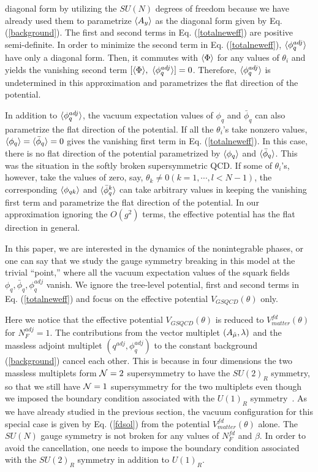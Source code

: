 \documentclass[a4paper,12pt]{article}
\begin{document}
diagonal form by utilizing the $SU(N)$ degrees of freedom
because we have already used them to parametrize $\langle A_y \rangle$ as 
the diagonal form given by Eq. (\ref{background}). 
The first and second terms in Eq. (\ref{totalneweff}) are positive 
semi-definite. In order to minimize the second term 
in Eq. (\ref{totalneweff}), $\langle \phi_q^{adj} \rangle$ have only 
a diagonal form. Then, it commutes with 
$\langle \Phi \rangle$ for any values of $\theta_i$ and yields the vanishing 
second term $[\langle \Phi \rangle,~\langle \phi_q^{adj} \rangle]=0$. 
Therefore, $\langle \phi_q^{adj} \rangle$ is undetermined in 
this approximation and parametrizes the flat direction of the potential.
\par
In addition to $\langle \phi_q^{adj} \rangle$, the vacuum 
expectation values of $\phi_q$ and ${\bar\phi}_q$ can also 
parametrize the flat direction of the potential. 
If all the $\theta_i$'s take nonzero values, 
$\langle \phi_q \rangle=\langle {\bar\phi}_q \rangle=0$ gives the 
vanishing first term in Eq. (\ref{totalneweff}). 
In this case, there is no flat direction
of the potential parametrized by $\langle \phi_q \rangle$ and $\langle {\bar\phi}_q \rangle$. 
This was the situation in the softly 
broken supersymmetric QCD. 
If some of $\theta_i$'s, however, take the values of 
zero, say, $\theta_k\neq 0 (k=1,\cdots, l< N-1)$, the corresponding 
$\langle \phi_{qk} \rangle$ and $\langle {\bar\phi}_q^{k} \rangle$ can take 
arbitrary values in keeping the vanishing first term and parametrize
the flat direction of the potential. In our approximation
ignoring the $O(g^2)$ terms, the effective potential has the 
flat direction in general.
\par
In this paper, we are interested in the dynamics of the nonintegrable 
phases, or one can say that 
we study the gauge symmetry breaking in this
model at the trivial ``point,'' where all the vacuum expectation 
values of the squark 
fields $\phi_q, {\bar\phi}_q, \phi_q^{adj}$ vanish.  We  
ignore the tree-level potential, first and second terms in 
Eq. (\ref{totalneweff}) and  
focus on the effective potential $V_{GSQCD}(\theta)$ only.
\par
Here we notice that the effective potential $V_{GSQCD}(\theta)$ is 
reduced to $V_{matter}^{fd}(\theta)$ for $N_F^{adj}=1$. 
The contributions from the vector multiplet 
$(A_{\hat\mu}, \lambda)$ and the massless adjoint 
multiplet $(q^{adj},\phi_q^{adj})$ to the constant 
background (\ref{background})
cancel each other. This is because in four dimensions the two 
massless multiplets form ${\cal N}=2$ supersymmetry 
to have the $SU(2)_R$ symmetry, so that we still have 
${\cal N}=1$ supersymmetry for the two multiplets even though
we imposed the boundary condition
associated with the $U(1)_R$ symmetry~\cite{takenaga}. 
As we have already studied in the previous 
section, the vacuum configuration for this special case is 
given by Eq. (\ref{fdsol}) from 
the potential $V_{matter}^{fd}(\theta)$ alone. The $SU(N)$ gauge 
symmetry is not broken for any 
values of $N_F^{fd}$ and $\beta$. In order to avoid the cancellation, one 
needs to impose the boundary condition
associated with the $SU(2)_R$ symmetry in addition to $U(1)_R$.
\end{document}
